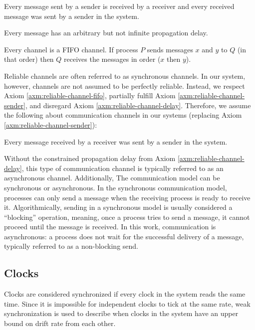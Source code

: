 \begin{axm}
    \label{axm:reliable-channel-sender}
    Every message sent by a sender is received by a receiver and every received message was sent by a sender in the system. 
\end{axm}

\begin{axm}
    \label{axm:reliable-channel-delay}
    Every message has an arbitrary but not infinite propagation delay.
\end{axm}

\begin{axm}
    \label{axm:reliable-channel-fifo}
    Every channel is a \ac{FIFO} channel. If process $P$ sends messages $x$ and $y$ to $Q$ (in that order) then $Q$ receives the messages in order ($x$ then $y$).
\end{axm}

Reliable channels are often referred to as synchronous channels.
In our system, however, channels are not assumed to be perfectly reliable.
Instead, we respect Axiom \ref{axm:reliable-channel-fifo}, partially fulfill Axiom \ref{axm:reliable-channel-sender}, and disregard Axiom \ref{axm:reliable-channel-delay}.
Therefore, we assume the following about communication channels in our systems (replacing Axiom \ref{axm:reliable-channel-sender}):
\begin{axm}
    Every message received by a receiver was sent by a sender in the system.
\end{axm}

Without the constrained propagation delay from Axiom \ref{axm:reliable-channel-delay}, this type of communication channel is typically referred to as an asynchronous channel.
Additionally, The communication model can be synchronous or asynchronous.
In the synchronous communication model, processes can only send a message when the receiving process is ready to receive it.
Algorithmically, sending in a synchronous model is usually considered a ``blocking'' operation, meaning, once a process tries to send a message, it cannot proceed until the message is received.
In this work, communication is asynchronous: a process does not wait for the successful delivery of a message, typically referred to as a non-blocking send.

\subsection{Clocks}
Clocks are considered synchronized if every clock in the system reads the same time.
Since it is impossible for independent clocks to tick at the same rate, weak synchronization is used to describe when clocks in the system have an upper bound on drift rate from each other.

